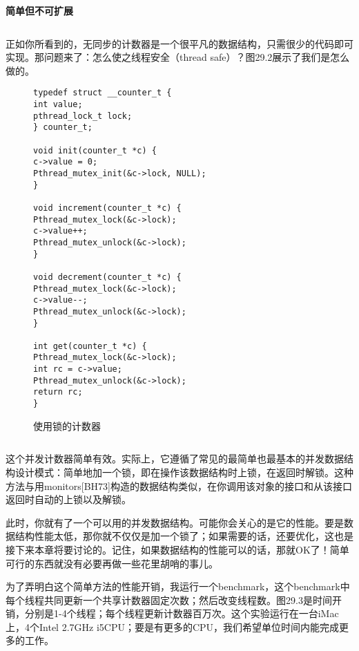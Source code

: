 \textbf{简单但不可扩展}


\begin{verbatim}
\end{verbatim}

正如你所看到的，无同步的计数器是一个很平凡的数据结构，只需很少的代码即可实现。那问题来了：怎么使之线程安全（thread safe）？图29.2展示了我们是怎么做的。
\begin{figure}[h]
\begin{lstlisting}
typedef struct __counter_t {
int value;
pthread_lock_t lock;
} counter_t;

void init(counter_t *c) {
c->value = 0;
Pthread_mutex_init(&c->lock, NULL);
}

void increment(counter_t *c) {
Pthread_mutex_lock(&c->lock);
c->value++;
Pthread_mutex_unlock(&c->lock);
}

void decrement(counter_t *c) {
Pthread_mutex_lock(&c->lock);
c->value--;
Pthread_mutex_unlock(&c->lock);
}

int get(counter_t *c) {
Pthread_mutex_lock(&c->lock);
int rc = c->value;
Pthread_mutex_unlock(&c->lock);
return rc;
}
\end{lstlisting}
\caption{使用锁的计数器}
\end{figure}

\begin{figure}[h]
\begin{lstlisting}

\end{lstlisting}
\caption{}
\end{figure}

这个并发计数器简单有效。实际上，它遵循了常见的最简单也最基本的并发数据结构设计模式：简单地加一个锁，即在操作该数据结构时上锁，在返回时解锁。这种方法与用monitors[BH73]构造的数据结构类似，在你调用该对象的接口和从该接口返回时自动的上锁以及解锁。

此时，你就有了一个可以用的并发数据结构。可能你会关心的是它的性能。要是数据结构性能太低，那你就不仅仅是加一个锁了；如果需要的话，还要优化，这也是接下来本章将要讨论的。记住，如果数据结构的性能可以的话，那就OK了！简单可行的东西就没有必要再做一些花里胡哨的事儿。

为了弄明白这个简单方法的性能开销，我运行一个benchmark，这个benchmark中每个线程共同更新一个共享计数器固定次数；然后改变线程数。图29.3是时间开销，分别是1-4个线程；每个线程更新计数器百万次。这个实验运行在一台iMac上，4个Intel 2.7GHz i5CPU；要是有更多的CPU，我们希望单位时间内能完成更多的工作。


